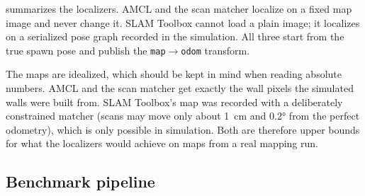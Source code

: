 \documentclass[11pt,letterpaper]{article}
\newcommand{\code}[1]{\texttt{#1}}
\begin{document}
 summarizes the localizers. AMCL and the scan matcher localize on a fixed map
image and never change it. SLAM Toolbox cannot load a plain image; it localizes on a serialized pose
graph recorded in the simulation. All three start from the true spawn pose and publish the
\code{map}$\to$\code{odom} transform.

The maps are idealized, which should be kept in mind when reading absolute numbers. AMCL and the
scan matcher get exactly the wall pixels the simulated walls were built from. SLAM Toolbox's map was
recorded with a deliberately constrained matcher (scans may move only about \SI{1}{cm} and
\ang{0.2} from the perfect odometry), which is only possible in simulation. Both are therefore
upper bounds for what the localizers would achieve on maps from a real mapping run.

\subsection{Benchmark pipeline}
\end{document}
